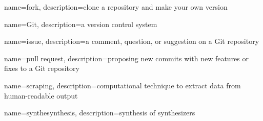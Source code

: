 {
    name={fork},
    description={clone a repository and make your own version}
}

{
    name={Git},
    description={a version control system}
}

{
    name={issue},
    description={a comment, question, or suggestion on a Git repository}
}

{
    name={pull request},
    description={proposing new commits with new features or fixes to a Git repository}
}

{
    name={scraping},
    description={computational technique to extract data from human-readable output}
}

{
    name={synthesynthesis},
    description={synthesis of synthesizers}
}
